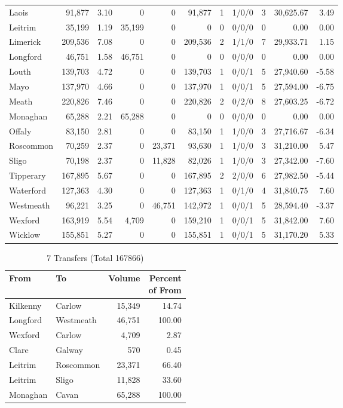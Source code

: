 \documentclass[a4paper]{article}
\begin{document}
\begin{longtable}{lrrrrrrlrrr}
Laois&91,877& 3.10&0&0&91,877&1&1/0/0&3&30,625.67& 3.49\\ 
Leitrim&35,199& 1.19&35,199&0&0&0&0/0/0&0& 0.00& 0.00\\ 
Limerick&209,536& 7.08&0&0&209,536&2&1/1/0&7&29,933.71& 1.15\\ 
Longford&46,751& 1.58&46,751&0&0&0&0/0/0&0& 0.00& 0.00\\ 
Louth&139,703& 4.72&0&0&139,703&1&0/0/1&5&27,940.60&-5.58\\ 
Mayo&137,970& 4.66&0&0&137,970&1&0/0/1&5&27,594.00&-6.75\\ 
Meath&220,826& 7.46&0&0&220,826&2&0/2/0&8&27,603.25&-6.72\\ 
Monaghan&65,288& 2.21&65,288&0&0&0&0/0/0&0& 0.00& 0.00\\ 
Offaly&83,150& 2.81&0&0&83,150&1&1/0/0&3&27,716.67&-6.34\\ 
Roscommon&70,259& 2.37&0&23,371&93,630&1&1/0/0&3&31,210.00& 5.47\\ 
Sligo&70,198& 2.37&0&11,828&82,026&1&1/0/0&3&27,342.00&-7.60\\ 
Tipperary&167,895& 5.67&0&0&167,895&2&2/0/0&6&27,982.50&-5.44\\ 
Waterford&127,363& 4.30&0&0&127,363&1&0/1/0&4&31,840.75& 7.60\\ 
Westmeath&96,221& 3.25&0&46,751&142,972&1&0/0/1&5&28,594.40&-3.37\\ 
Wexford&163,919& 5.54&4,709&0&159,210&1&0/0/1&5&31,842.00& 7.60\\ 
Wicklow&155,851& 5.27&0&0&155,851&1&0/0/1&5&31,170.20& 5.33\\ 
\end{longtable}

\begin{table}[htbp]
\caption{7 Transfers (Total 167866)}
\centering
\begin{tabular}{llrr} \toprule
From &To &Volume &\shortstack{Percent\\of From} \\ \midrule
Kilkenny&Carlow&15,349&14.74\\ 
Longford&Westmeath&46,751&100.00\\ 
Wexford&Carlow&4,709& 2.87\\ 
Clare&Galway&570& 0.45\\ 
Leitrim&Roscommon&23,371&66.40\\ 
Leitrim&Sligo&11,828&33.60\\ 
Monaghan&Cavan&65,288&100.00\\ 
\bottomrule
\end{tabular}
\end{table}
\end{document}
